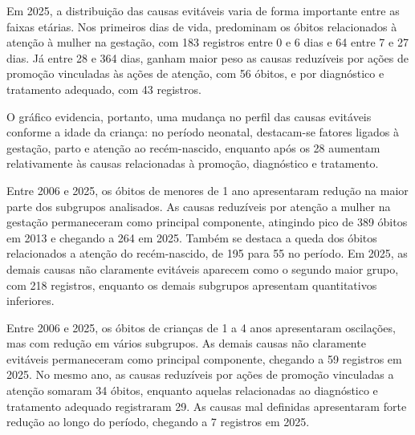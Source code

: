 
Em 2025, a distribuição das causas evitáveis varia de forma importante entre as faixas etárias. Nos primeiros dias de vida, predominam os óbitos relacionados à atenção à mulher na gestação, com 183 registros entre 0 e 6 dias e 64 entre 7 e 27 dias. Já entre 28 e 364 dias, ganham maior peso as causas reduzíveis por ações de promoção vinculadas às ações de atenção, com 56 óbitos, e por diagnóstico e tratamento adequado, com 43 registros.

O gráfico evidencia, portanto, uma mudança no perfil das causas evitáveis conforme a idade da criança: no período neonatal, destacam-se fatores ligados à gestação, parto e atenção ao recém-nascido, enquanto após os 28 aumentam relativamente às causas relacionadas à promoção, diagnóstico e tratamento.


Entre 2006 e 2025, os óbitos de menores de 1 ano apresentaram redução na maior parte dos subgrupos analisados. As causas reduzíveis por atenção a mulher na gestação permaneceram como principal componente, atingindo pico de 389 óbitos em 2013 e chegando a 264 em 2025. Também se destaca a queda dos óbitos relacionados a atenção do recém-nascido, de 195 para 55 no período. Em 2025, as demais causas não claramente evitáveis aparecem como o segundo maior grupo, com 218 registros, enquanto os demais subgrupos apresentam quantitativos inferiores.


Entre 2006 e 2025, os óbitos de crianças de 1 a 4 anos apresentaram oscilações, mas com redução em vários subgrupos. As demais causas não claramente evitáveis permaneceram como principal componente, chegando a 59 registros em 2025. No mesmo ano, as causas reduzíveis por ações de promoção vinculadas a atenção somaram 34 óbitos, enquanto aquelas relacionadas ao diagnóstico e tratamento adequado registraram 29. As causas mal definidas apresentaram forte redução ao longo do período, chegando a 7 registros em 2025.

